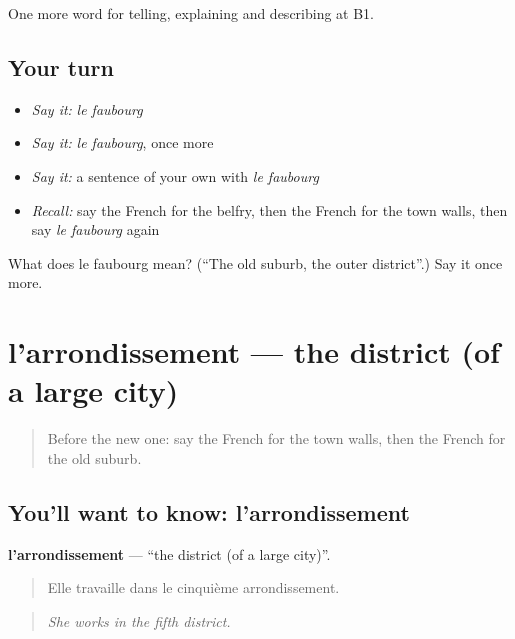\begin{grammarlens}[title={What you've built}]
One more word for telling, explaining and describing at B1.
\end{grammarlens}

\subsection*{Your turn}
\begin{itemize}
\raggedright
  \item \emph{Say it:} \emph{le faubourg}
  \item \emph{Say it:} \emph{le faubourg}, once more
  \item \emph{Say it:} a sentence of your own with \emph{le faubourg}
  \item \emph{Recall:} say the French for the belfry, then the French for the town walls, then say \emph{le faubourg} again
\end{itemize}

\begin{tcolorbox}[breakable,colback=teal!4,colframe=teal!35!black,title={Before you move on}]
What does le faubourg mean? (\textquotedblleft{}The old suburb, the outer district\textquotedblright{}.) Say it once more.
\end{tcolorbox}
\section[l'arrondissement]{l'arrondissement — the district (of a large city)}

\label{lesson:FR-C440-arrondissement}



\begin{quote}
Before the new one: say the French for the town walls, then the French for the old suburb.
\end{quote}

\subsection*{You'll want to know: l'arrondissement}
\textbf{l'arrondissement} — \textquotedblleft{}the district (of a large city)\textquotedblright{}.

\begin{quote}
Elle travaille dans le cinquième arrondissement.
\end{quote}

\begin{quote}
\emph{She works in the fifth district.}
\end{quote}

